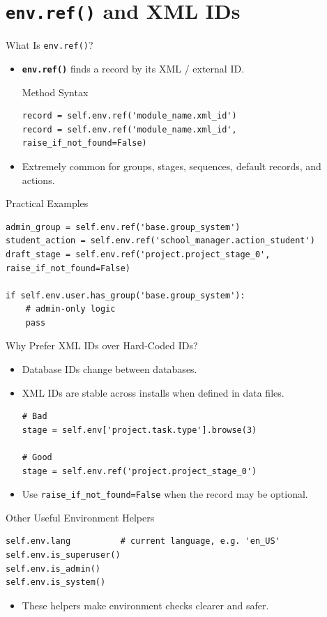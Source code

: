 \section{\texttt{env.ref()} and XML IDs}

\begin{frame}[fragile]{What Is \texttt{env.ref()}?}
	\begin{itemize}
		\item \textbf{\texttt{env.ref()}} finds a record by its XML / external ID.
\begin{block}{Method Syntax}
\begin{lstlisting}
record = self.env.ref('module_name.xml_id')
record = self.env.ref('module_name.xml_id', raise_if_not_found=False)
\end{lstlisting}
\end{block}
		\item Extremely common for groups, stages, sequences, default records, and actions.
	\end{itemize}
\end{frame}

\begin{frame}[fragile]{Practical Examples}
\begin{lstlisting}
admin_group = self.env.ref('base.group_system')
student_action = self.env.ref('school_manager.action_student')
draft_stage = self.env.ref('project.project_stage_0', raise_if_not_found=False)

if self.env.user.has_group('base.group_system'):
	# admin-only logic
	pass
\end{lstlisting}
\end{frame}

\begin{frame}[fragile]{Why Prefer XML IDs over Hard-Coded IDs?}
	\begin{itemize}
		\item Database IDs change between databases.
		\item XML IDs are stable across installs when defined in data files.
\begin{lstlisting}
# Bad
stage = self.env['project.task.type'].browse(3)

# Good
stage = self.env.ref('project.project_stage_0')
\end{lstlisting}
		\item Use \texttt{raise\_if\_not\_found=False} when the record may be optional.
	\end{itemize}
\end{frame}

\begin{frame}[fragile]{Other Useful Environment Helpers}
\begin{lstlisting}
self.env.lang          # current language, e.g. 'en_US'
self.env.is_superuser()
self.env.is_admin()
self.env.is_system()
\end{lstlisting}
	\begin{itemize}
		\item These helpers make environment checks clearer and safer.
	\end{itemize}
\end{frame}
